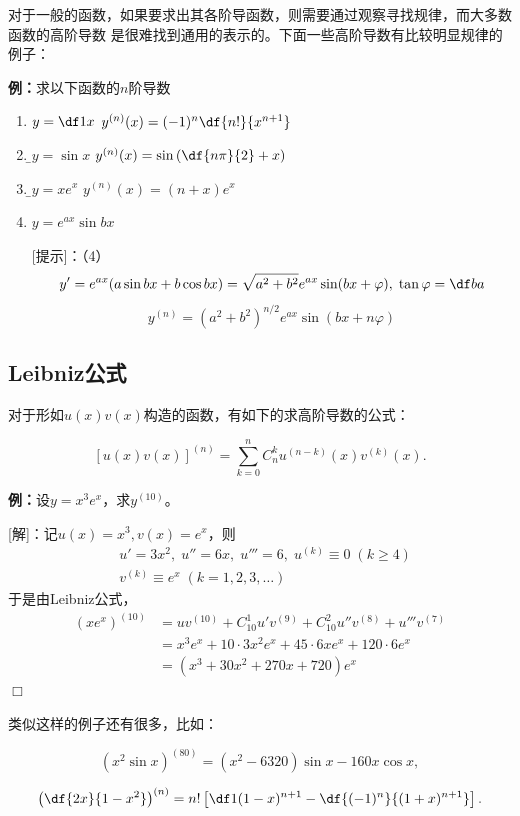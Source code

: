 对于一般的函数，如果要求出其各阶导函数，则需要通过观察寻找规律，而大多数函数的高阶导数
是很难找到通用的表示的。下面一些高阶导数有比较明显规律的例子：

{\bf 例：}求以下函数的$n$阶导数
\begin{enumerate}[(1)]
  \setlength{\itemindent}{1cm}
  \item $y=\df 1x$ \hfill $y^{(n)}(x)=(-1)^n\df{n!}{x^{n+1}}$ 
  \item {\b$y=\sin x$ \hfill
  $y^{(n)}(x)=\sin\left(\df{n\pi}{2}+x\right)$} 
  \item {\b$y=xe^x$ \hfill $y^{(n)}(x)=(n+x)e^x$}
  \item $y=e^{ax}\sin bx$

[提示]：（4）
$$y'=e^{ax}(a\sin bx+b\cos
bx)=\sqrt{a^2+b^2}e^{ax}\sin(bx+\varphi),
\;\tan\varphi=\df ba$$
$$y^{(n)}=\left(a^2+b^2\right)^{n/2}e^{ax}\sin(bx+n\varphi)$$ 
\end{enumerate}

\subsection{Leibniz公式}

对于形如$u(x)v(x)$构造的函数，有如下的求高阶导数的公式：

\begin{thx}
	$$\left[u(x)v(x)\right]^{(n)}=
	\sum\limits_{k=0}^nC_n^ku^{(n-k)}(x)v^{(k)}(x).$$
\end{thx}

{\bf 例：}设$y=x^3e^x$，求$y^{(10)}$。

[解]：记$u(x)=x^3,v(x)=e^x$，则
\begin{align*}
	& u'=3x^2, \; u''=6x, \; u'''=6, \; u^{(k)}\equiv 0\;(k\geq 4)\\
	& v^{(k)}\equiv e^x\;(k=1,2,3,\ldots)
\end{align*}
于是由Leibniz公式，
\begin{align*}
	(xe^x)^{(10)}
	&=uv^{(10)}+C_{10}^1u'v^{(9)}+C_{10}^2u''v^{(8)}+u'''v^{(7)}\\
	&=x^3e^x+10\cdot 3x^2e^x+45\cdot 6xe^x+120\cdot 6e^x\\
	&=(x^3+30x^2+270x+720)e^x
\end{align*}
\hfill$\Box$

类似这样的例子还有很多，比如：

$$(x^2\sin x)^{(80)}=(x^2-6320)\sin x-160x\cos x,$$

$$\left(\df{2x}{1-x^2}\right)^{(n)}=n!\left[\df1{(1-x)^{n+1}}
-\df{(-1)^n}{(1+x)^{n+1}}\right].$$

